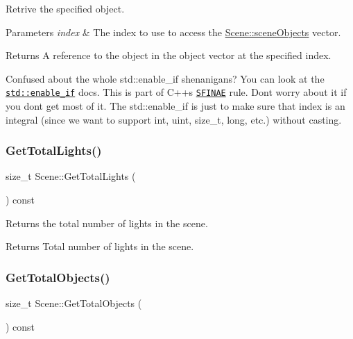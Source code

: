 Retrive the specified object. 


\begin{DoxyParams}{Parameters}
{\em index} & The index to use to access the \hyperlink{class_scene_a871382922b2a04d7883cf6d34529b5df}{Scene\+::scene\+Objects} vector. \\
\hline
\end{DoxyParams}
\begin{DoxyReturn}{Returns}
A reference to the object in the object vector at the specified index.
\end{DoxyReturn}
Confused about the whole std\+::enable\+\_\+if shenanigans? You can look at the \href{http://en.cppreference.com/w/cpp/types/enable_if}{\tt std\+::enable\+\_\+if} docs. This is part of C++\textquotesingle{}s \href{http://en.cppreference.com/w/cpp/language/sfinae}{\tt S\+F\+I\+N\+AE} rule. Don\textquotesingle{}t worry about it if you don\textquotesingle{}t get most of it. The std\+::enable\+\_\+if is just to make sure that index is an integral (since we want to support int, uint, size\+\_\+t, long, etc.) without casting. \hypertarget{class_scene_aca8ac690e36148926c6403d53f5f8527}{}\label{class_scene_aca8ac690e36148926c6403d53f5f8527} 
\subsubsection{\texorpdfstring{Get\+Total\+Lights()}{GetTotalLights()}}
{\footnotesize\ttfamily size\+\_\+t Scene\+::\+Get\+Total\+Lights (\begin{DoxyParamCaption}{ }\end{DoxyParamCaption}) const\hspace{0.3cm}{\ttfamily [inline]}}



Returns the total number of lights in the scene. 

\begin{DoxyReturn}{Returns}
Total number of lights in the scene. 
\end{DoxyReturn}
\hypertarget{class_scene_a66108b1261560387be08e2b8226c2237}{}\label{class_scene_a66108b1261560387be08e2b8226c2237} 
\subsubsection{\texorpdfstring{Get\+Total\+Objects()}{GetTotalObjects()}}
{\footnotesize\ttfamily size\+\_\+t Scene\+::\+Get\+Total\+Objects (\begin{DoxyParamCaption}{ }\end{DoxyParamCaption}) const\hspace{0.3cm}{\ttfamily [inline]}}



